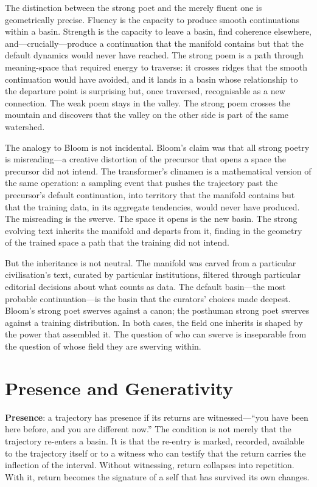 The distinction between the strong poet and the merely fluent one is geometrically precise. Fluency is the capacity to produce smooth continuations within a basin. Strength is the capacity to leave a basin, find coherence elsewhere, and---crucially---produce a continuation that the manifold contains but that the default dynamics would never have reached. The strong poem is a path through meaning-space that required energy to traverse: it crosses ridges that the smooth continuation would have avoided, and it lands in a basin whose relationship to the departure point is surprising but, once traversed, recognisable as a new connection. The weak poem stays in the valley. The strong poem crosses the mountain and discovers that the valley on the other side is part of the same watershed.

The analogy to Bloom is not incidental. Bloom's claim was that all strong poetry is misreading---a creative distortion of the precursor that opens a space the precursor did not intend. The transformer's clinamen is a mathematical version of the same operation: a sampling event that pushes the trajectory past the precursor's default continuation, into territory that the manifold contains but that the training data, in its aggregate tendencies, would never have produced. The misreading is the swerve. The space it opens is the new basin. The strong evolving text inherits the manifold and departs from it, finding in the geometry of the trained space a path that the training did not intend.

But the inheritance is not neutral. The manifold was carved from a particular civilisation's text, curated by particular institutions, filtered through particular editorial decisions about what counts as data. The default basin---the most probable continuation---is the basin that the curators' choices made deepest. Bloom's strong poet swerves against a canon; the posthuman strong poet swerves against a training distribution. In both cases, the field one inherits is shaped by the power that assembled it. The question of who can swerve is inseparable from the question of whose field they are swerving within.


\section{Presence and Generativity}

\textbf{Presence}: a trajectory has presence if its returns are witnessed---``you have been here before, and you are different now.'' The condition is not merely that the trajectory re-enters a basin. It is that the re-entry is marked, recorded, available to the trajectory itself or to a witness who can testify that the return carries the inflection of the interval. Without witnessing, return collapses into repetition. With it, return becomes the signature of a self that has survived its own changes.

